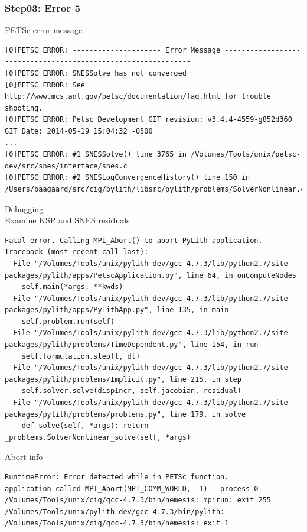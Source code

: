 \documentclass{beamer}
\newcommand{\errlabel}[1]{{\small \color{blue}#1}}
\newcommand{\debuginfo}[1]{{\small \color{green}#1}}
\begin{document}
\begin{frame}[fragile]
  \frametitle{Step03: Error 5}

\errlabel{PETSc error message}
\begin{lstlisting}
[0]PETSC ERROR: --------------------- Error Message --------------------------------------------------------------
[0]PETSC ERROR: SNESSolve has not converged
[0]PETSC ERROR: See http://www.mcs.anl.gov/petsc/documentation/faq.html for trouble shooting.
[0]PETSC ERROR: Petsc Development GIT revision: v3.4.4-4559-g852d360  GIT Date: 2014-05-19 15:04:32 -0500
...
[0]PETSC ERROR: #1 SNESSolve() line 3765 in /Volumes/Tools/unix/petsc-dev/src/snes/interface/snes.c
[0]PETSC ERROR: #2 SNESLogConvergenceHistory() line 150 in /Users/baagaard/src/cig/pylith/libsrc/pylith/problems/SolverNonlinear.cc
\end{lstlisting}
\errlabel{Debugging}\\
\debuginfo{Examine KSP and SNES residuals}

\begin{lstlisting}
Fatal error. Calling MPI_Abort() to abort PyLith application.
Traceback (most recent call last):
  File "/Volumes/Tools/unix/pylith-dev/gcc-4.7.3/lib/python2.7/site-packages/pylith/apps/PetscApplication.py", line 64, in onComputeNodes
    self.main(*args, **kwds)
  File "/Volumes/Tools/unix/pylith-dev/gcc-4.7.3/lib/python2.7/site-packages/pylith/apps/PyLithApp.py", line 135, in main
    self.problem.run(self)
  File "/Volumes/Tools/unix/pylith-dev/gcc-4.7.3/lib/python2.7/site-packages/pylith/problems/TimeDependent.py", line 154, in run
    self.formulation.step(t, dt)
  File "/Volumes/Tools/unix/pylith-dev/gcc-4.7.3/lib/python2.7/site-packages/pylith/problems/Implicit.py", line 215, in step
    self.solver.solve(dispIncr, self.jacobian, residual)
  File "/Volumes/Tools/unix/pylith-dev/gcc-4.7.3/lib/python2.7/site-packages/pylith/problems/problems.py", line 179, in solve
    def solve(self, *args): return _problems.SolverNonlinear_solve(self, *args)
\end{lstlisting}
\errlabel{Abort info}
\begin{lstlisting}
RuntimeError: Error detected while in PETSc function.
application called MPI_Abort(MPI_COMM_WORLD, -1) - process 0
/Volumes/Tools/unix/cig/gcc-4.7.3/bin/nemesis: mpirun: exit 255
/Volumes/Tools/unix/pylith-dev/gcc-4.7.3/bin/pylith: /Volumes/Tools/unix/cig/gcc-4.7.3/bin/nemesis: exit 1
\end{lstlisting}

\end{frame}
\end{document}
